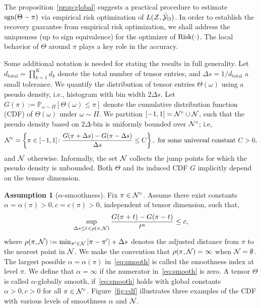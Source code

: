 \documentclass[twoside,11pt]{article}
\theoremstyle{plain}
\theoremstyle{definition}
\newtheorem{assumption}{Assumption}
\def\sign{\textup{sgn}}
\def\risk{\textup{Risk}}
\begin{document}
The proposition~\ref{prop:global} suggests a practical procedure to estimate $\sign(\Theta-\pi)$ via empirical risk optimization of $L(\mathcal{Z},\bar {\mathcal{Y}}_\Omega)$.
In order to establish the recovery guarantee from empirical risk optimization, we shall address the uniqueness (up to sign equivalence) for the optimizer of $\risk(\cdot)$. The local behavior of $\Theta$ around $\pi$ plays a key role in the accuracy. 

Some additional notation is needed for stating the results in full generality. Let $d_\text{total}=\prod_{k=1}^K d_k$ denote the total number of tensor entries, and $\Delta s = 1/d_\text{total}$ a small tolerance. We quantify the distribution of tensor entries $\Theta(\omega)$ using a pseudo density, i.e., histogram with bin width $2\Delta s$. Let $G(\pi):=\mathbb{P}_{\omega\sim \Pi}[\Theta(\omega)\leq \pi]$ denote the cumulative distribution function (CDF) of $\Theta(\omega)$ under $\omega\sim \Pi$. We partition $[-1,1]=\mathcal{N}^c \cup \mathcal{N}$, such that the pseudo density based on $2\Delta$-bin is uniformly bounded over $\mathcal{N}^c$; i.e,
\[
\tN^c=\left\{\pi\in[-1,1] \colon {G(\pi+{\Delta s})-G(\pi-{\Delta s})\over \Delta s} \leq C \right\},\ \text{for some universal constant $C>0$},
\]
and $\mathcal{N}$ otherwise. Informally, the set $\mathcal{N}$ collects the jump points for which the pseudo density is unbounded. Both $\Theta$ and its induced CDF $G$ implicitly depend on the tensor dimension. 

\begin{assumption}[$\alpha$-smoothness]\label{ass:margin} Fix $\pi \in\mathcal{N}^c$. Assume there exist constants $\alpha=\alpha(\pi)> 0, c=c(\pi) >0$, independent of tensor dimension, such that, 
\begin{equation}\label{eq:smooth}
\sup_{\Delta s \leq t<\rho(\pi, \mathcal{N})}{G(\pi+{t})-G(\pi-{t})\over t^\alpha} \leq c,
\end{equation}
where $\rho(\pi,\mathcal{N}):=\min_{\pi'\in \mathcal{N}}|\pi-\pi'|+\Delta s$ denotes the adjusted distance from $\pi$ to the nearest point in $\mathcal{N}$. We make the convention that $\rho(\pi,\mathcal{N}) = \infty$ when $\mathcal{N} = \emptyset$. The largest possible $\alpha=\alpha(\pi)$ in~\eqref{eq:smooth} is called the smoothness index at level $\pi$. We define that  $\alpha=\infty$ if the numerator in~\eqref{eq:smooth} is zero. A tensor $\Theta$ is called $\alpha$-globally smooth, if~\eqref{eq:smooth} holds with global constants $\alpha>0, c>0$ for all $\pi\in\mathcal{N}^c$. Figure~\ref{fig:cdf} illustrates three examples of the CDF with various levels of smoothness $\alpha$ and $\mathcal{N}$.
\end{assumption}
\end{document}
